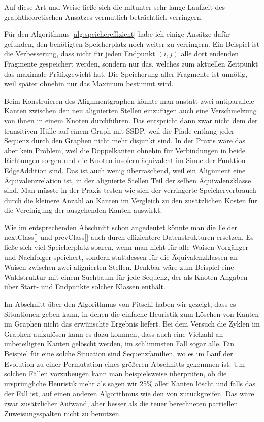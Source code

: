 {\noindent Auf diese Art und Weise ließe sich die mitunter sehr lange Laufzeit des graphtheoretischen Ansatzes vermutlich beträchtlich verringern.

Für den Algorithmus \ref{alg:speichereffizient} habe ich einige Ansätze dafür gefunden, den benötigten Speicherplatz noch weiter zu verringern. Ein Beispiel ist die Verbesserung, dass nicht für jeden Endpunkt $(i,j)$ alle dort endenden Fragmente gespeichert werden, sondern nur das, welches zum aktuellen Zeitpunkt das maximale Präfixgewicht hat. Die Speicherung aller Fragmente ist unnötig, weil später ohnehin nur das Maximum bestimmt wird.

Beim Konstruieren des Alignmentgraphen könnte man anstatt zwei antiparallele Kanten zwischen den neu alignierten Stellen einzufügen auch eine Verschmelzung von ihnen in einem Knoten durchführen. Das entspricht dann zwar nicht dem der transitiven Hülle auf einem Graph mit SSDP, weil die Pfade entlang jeder Sequenz durch den Graphen nicht mehr disjunkt sind. In der Praxis wäre das aber kein Problem, weil die Doppelkanten ohnehin für Verbindungen in beide Richtungen sorgen und die Knoten insofern äquivalent im Sinne der Funktion \textrm{EdgeAddition} sind. Das ist auch wenig überraschend, weil ein Alignment eine Äquivalenzrelation ist, in der alignierte Stellen Teil der selben Äquivalenzklasse sind. Man müsste in der Praxis testen wie sich der verringerte Speicherverbrauch durch die kleinere Anzahl an Kanten im Vergleich zu den zusätzlichen Kosten für die Vereinigung der ausgehenden Kanten auswirkt.

Wie im entsprechenden Abschnitt schon angedeutet könnte man die Felder nextClass[] und prevClass[] auch durch effizientere Datenstrukturen ersetzen. Es ließe sich viel Speicherplatz sparen, wenn man nicht für alle Waisen Vorgänger und Nachfolger speichert, sondern stattdessen für die Äquivalenzklassen an Waisen zwischen zwei alignierten Stellen. Denkbar wäre zum Beispiel eine Waldstruktur mit einem Suchbaum für jede Sequenz, der als Knoten Angaben über Start- und Endpunkte solcher Klassen enthält.

Im Abschnitt über den Algorithmus von Pitschi haben wir gezeigt, dass es Situationen geben kann, in denen die einfache Heuristik zum Löschen von Kanten im Graphen nicht das erwünschte Ergebnis liefert. Bei dem Versuch die Zyklen im Graphen aufzulösen kann es dazu kommen, dass auch eine Vielzahl an unbeteiligten Kanten gelöscht werden, im schlimmsten Fall sogar alle. Ein Beispiel für eine solche Situation sind Sequenzfamilien, wo es im Lauf der Evolution zu einer Permutation eines größeren Abschnitts gekommen ist. Um solchen Fällen vorzubeugen kann man beispielsweise überprüfen, ob die ursprüngliche Heuristik mehr als sagen wir 25\% aller Kanten löscht und falls das der Fall ist, auf einen anderen Algorithmus wie den von \cite{els93} zurückgreifen. Das wäre zwar zusätzlicher Aufwand, aber besser als die teuer berechneten partiellen Zuweisungsspalten nicht zu benutzen.

}
